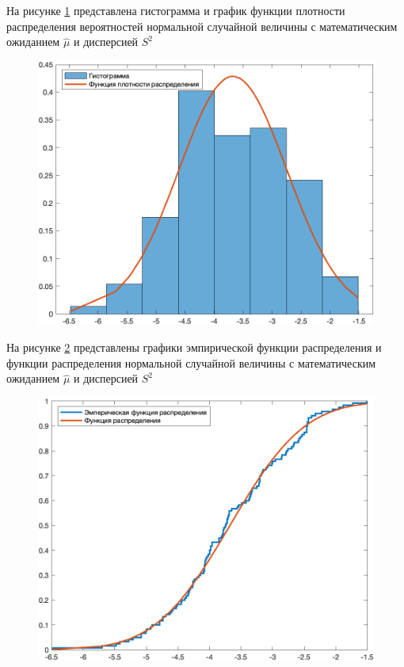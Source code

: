 На рисунке \ref{img:plot01} представлена гистограмма и график функции плотности распределения вероятностей нормальной случайной величины с математическим ожиданием $\hat \mu$ и дисперсией $S^2$
\begin{figure}[H]
    \centering
    \includegraphics[scale=1]{plots/1.png}
    \caption{}
    \label{img:plot01}
\end{figure}

На рисунке \ref{img:plot02} представлены графики эмпирической функции распределения и функции распределения нормальной случайной величины с математическим ожиданием $\hat \mu$ и дисперсией $S^2$
\begin{figure}[H]
    \centering
    \includegraphics[scale=1]{plots/2.png}
    \caption{}
    \label{img:plot02}
\end{figure}

